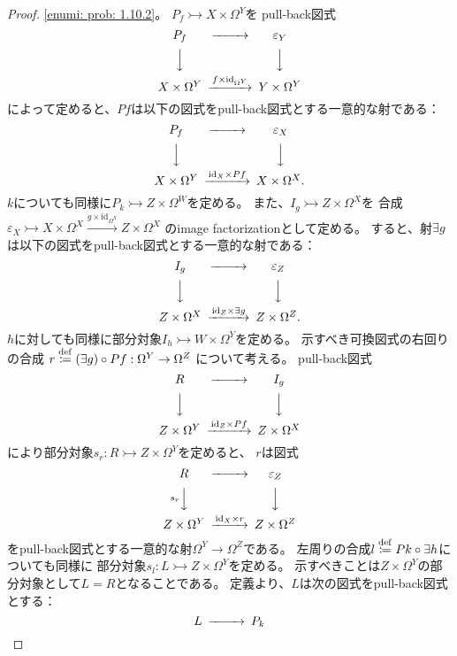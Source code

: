 \documentclass[uplatex]{jsarticle}
\theoremstyle{definition}
\def\ep{\varepsilon}
\def\id{\mathrm{id}}
\newcommand{\rtot}{\rightarrowtail}
\newcommand{\dfn}{\overset{\mathrm{\tiny def}}{\coloneqq}}
\begin{document}
\begin{proof}
  \ref{enumi: prob: 1.10.2}。
  \(P_f\rtot X\times \Omega^Y\)を
  pull-back図式
  \[
  \begin{CD}
    P_f @>>> \ep_Y \\
    @VVV @VVV \\
    X\times \Omega^Y @> f\times \id_{\Omega^Y} >> Y\times \Omega^Y
  \end{CD}
  \]
  によって定めると、\(Pf\)は以下の図式をpull-back図式とする一意的な射である：
  \[
  \begin{CD}
    P_f @>>> \ep_X \\
    @VVV @VVV \\
    X\times \Omega^Y @> \id_X \times Pf >> X\times \Omega^X.
  \end{CD}
  \]
  \(k\)についても同様に\(P_k\rtot Z\times \Omega^W\)を定める。
  また、\(I_g \rtot Z\times \Omega^X\)を
  合成
  \(\ep_X \rtot X\times \Omega^X \xrightarrow{g\times \id_{\Omega^X}} Z\times \Omega^X\)
  のimage factorizationとして定める。
  すると、射\(\exists g\)は以下の図式をpull-back図式とする一意的な射である：
  \[
  \begin{CD}
    I_g @>>> \ep_Z \\
    @VVV @VVV \\
    Z\times \Omega^X @> \id_Z \times \exists g >> Z\times \Omega^Z.
  \end{CD}
  \]
  \(h\)に対しても同様に部分対象\(I_h\rtot W\times \Omega^Y\)を定める。
  示すべき可換図式の右回りの合成
  \(r \dfn (\exists g) \circ Pf: \Omega^Y \to \Omega^Z\)
  について考える。
  pull-back図式
  \[
  \begin{CD}
    R @>>> I_g \\
    @VVV @VVV \\
    Z\times \Omega^Y @> \id_Z \times Pf >> Z\times \Omega^X
  \end{CD}
  \]
  により部分対象\(s_r : R \rtot Z\times \Omega^Y\)を定めると、
  \(r\)は図式
  \[
  \begin{CD}
    R @>>> \ep_Z \\
    @V s_r VV @VVV \\
    Z\times \Omega^Y @> \id_X \times r >> Z\times \Omega^Z
  \end{CD}
  \]
  をpull-back図式とする一意的な射\(\Omega^Y\to \Omega^Z\)である。
  左周りの合成\(l\dfn Pk\circ \exists h\)についても同様に
  部分対象\(s_l: L\rtot Z\times \Omega^Y\)を定める。
  示すべきことは\(Z\times \Omega^Y\)の部分対象として\(L=R\)となることである。
  定義より、\(L\)は次の図式をpull-back図式とする：
  \[
  \begin{CD}
    L @>>> P_k \\

\end{CD}\]
\end{proof}
\end{document}
